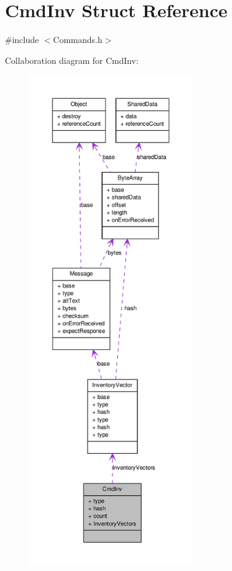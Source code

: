 \hypertarget{struct_cmd_inv}{
\section{CmdInv Struct Reference}
\label{struct_cmd_inv}
}


{\ttfamily \#include $<$Commands.h$>$}



Collaboration diagram for CmdInv:
\nopagebreak
\begin{figure}[H]
\begin{center}
\leavevmode
\includegraphics[height=600pt]{struct_cmd_inv__coll__graph}
\end{center}
\end{figure}
